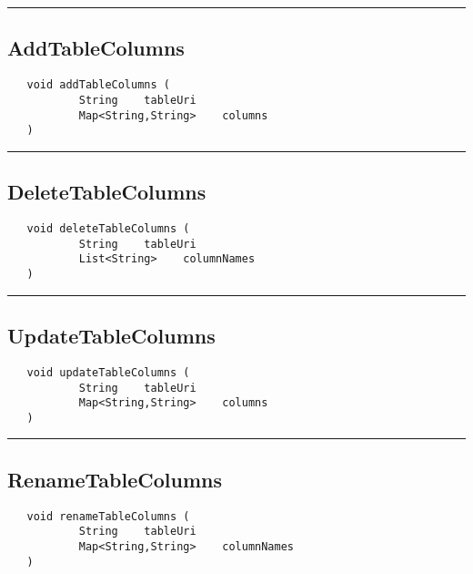\rule{15cm}{2pt}
\subsection{AddTableColumns}
\label{Api:AddTableColumns}
\begin{verbatim}
   void addTableColumns (
           String    tableUri
           Map<String,String>    columns
   )
\end{verbatim}



\rule{15cm}{2pt}
\subsection{DeleteTableColumns}
\label{Api:DeleteTableColumns}
\begin{verbatim}
   void deleteTableColumns (
           String    tableUri
           List<String>    columnNames
   )
\end{verbatim}



\rule{15cm}{2pt}
\subsection{UpdateTableColumns}
\label{Api:UpdateTableColumns}
\begin{verbatim}
   void updateTableColumns (
           String    tableUri
           Map<String,String>    columns
   )
\end{verbatim}



\rule{15cm}{2pt}
\subsection{RenameTableColumns}
\label{Api:RenameTableColumns}
\begin{verbatim}
   void renameTableColumns (
           String    tableUri
           Map<String,String>    columnNames
   )
\end{verbatim}



